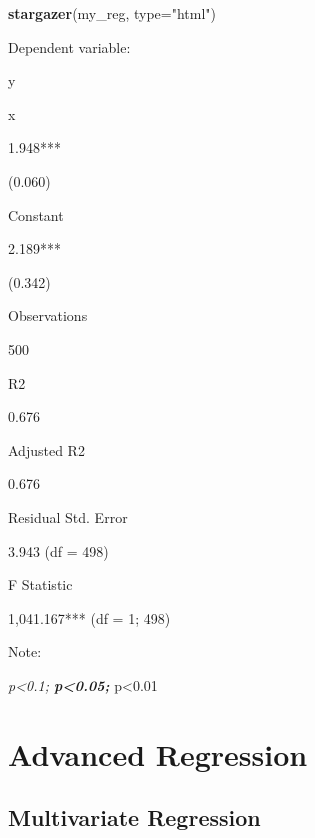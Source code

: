 \documentclass[]{book}
\newenvironment{Shaded}{\begin{snugshade}}{\end{snugshade}}
\newcommand{\KeywordTok}[1]{\textcolor[rgb]{0.13,0.29,0.53}{\textbf{#1}}}
\newcommand{\DataTypeTok}[1]{\textcolor[rgb]{0.13,0.29,0.53}{#1}}
\newcommand{\StringTok}[1]{\textcolor[rgb]{0.31,0.60,0.02}{#1}}
\newcommand{\NormalTok}[1]{#1}
\theoremstyle{definition}
\theoremstyle{definition}
\theoremstyle{definition}
\theoremstyle{remark}
\begin{document}
\begin{Shaded}
\begin{Highlighting}[]
\KeywordTok{stargazer}\NormalTok{(my_reg, }\DataTypeTok{type=}\StringTok{"html"}\NormalTok{) }
\end{Highlighting}
\end{Shaded}

Dependent variable:

y

x

1.948***

(0.060)

Constant

2.189***

(0.342)

Observations

500

R2

0.676

Adjusted R2

0.676

Residual Std. Error

3.943 (df = 498)

F Statistic

1,041.167*** (df = 1; 498)

Note:

\emph{p\textless{}0.1; \textbf{p\textless{}0.05; }}p\textless{}0.01

\chapter{Advanced Regression}\label{advanced-regression}

\section{Multivariate Regression}\label{multivariate-regression}
\end{document}
